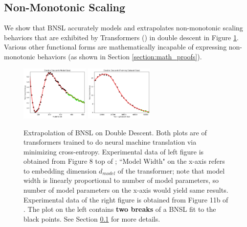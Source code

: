 \documentclass{article} %
\begin{document}
\subsection{Non-Monotonic Scaling}
\label{section:non-monotonic_scaling}
\vspace{-3.0mm}
We show that BNSL accurately models and extrapolates non-monotonic scaling behaviors that are exhibited by Transformers (\cite{vaswani2017attention}) in double descent \citep{nakkiran2021deep} in Figure \ref{fig:double_descent}. Various other functional forms are mathematically incapable of expressing non-monotonic behaviors (as shown in Section \ref{section:math_proofs}).

\vspace{-2.5mm}


\FloatBarrier
\begin{figure}[h]%
    \centering


\includegraphics[width=0.3\textwidth]{figures/double_descent/double_descent__model_size.png}
\includegraphics[width=0.3\textwidth]{figures/double_descent/double_descent__dataset_size_1.png}

    \caption{
    Extrapolation of BNSL on Double Descent. Both plots are of transformers trained to do neural machine translation via minimizing cross-entropy. Experimental data of left figure is obtained from Figure 8 top of \cite{nakkiran2021deep}; ``Model Width" on the x-axis refers to embedding dimension $d_{model}$ of the transformer; note that model width is linearly proportional to number of model parameters, so number of model parameters on the x-axis would yield same results. Experimental data of the right figure is obtained from Figure 11b of \cite{nakkiran2021deep}. The plot on the left contains \textbf{two breaks} of a BNSL fit to the black points. See Section \ref{section:non-monotonic_scaling} for more details.
    }
    \label{fig:double_descent}
\end{figure}
\end{document}
